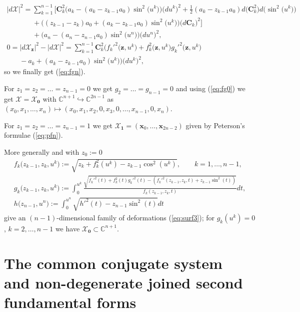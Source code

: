 \documentclass[11pt]{article}
\begin{document}
\begin{gather*}
|d\mathcal{X}|^2=\sum_{k=1}^{n-1}\big[\mathbf{C}_k^2\big(a_k-
(a_k-z_{k-1}a_0)\sin^2\big(u^k\big)\big)\big(du^k\big)^2
+\tfrac{1}{2}(a_k-z_{k-1}a_0)d\big(\mathbf{C}_k^2\big)d\big(\sin^2\big(u^k\big)\big)
\\
\phantom{|d\mathcal{X}|^2=}{}
+\big((z_{k-1}-z_k)a_0+
(a_k-z_{k-1}a_0)\sin^2\big(u^k\big)\big)\big(d\mathbf{C}_k\big)^2\big]\\
\phantom{|d\mathcal{X}|^2=}{}
+\big(a_n-(a_n-z_{n-1}a_0)\sin^2\big(u^n\big)\big)\big(du^n\big)^2,
\\
0=|d\mathcal{X}_{\mathbf{z}}|^2-|d\mathcal{X}|^2=
\sum_{k=1}^{n-1}\mathbf{C}_k^2\big(f_k'^2\big(\mathbf{z},u^k\big)
+f_k^2\big(\mathbf{z},u^k\big)g_k'^2\big(\mathbf{z},u^k\big)\\
\phantom{0=}{}-a_k+
(a_k-z_{k-1}a_0)\sin^2\big(u^k\big)\big)\big(du^k\big)^2,
\end{gather*}
so we f\/inally get (\ref{eq:fgn}).

For $z_1=z_2=\dots =z_{n-1}=0$ we get $g_2=\dots =g_{n-1}=0$ and using
(\ref{eq:fg0}) we get $\mathcal{X}=\mathcal{X}_{\mathbf{0}}$ with
$\mathbb{C}^{n+1}\hookrightarrow\mathbb{C}^{2n-1}$ as
$(x_0,x_1,\dots ,x_n)\mapsto(x_0,x_1,x_2,0,x_3,0,\dots ,x_{n-1},0,x_n)$.

For $z_1=z_2=\dots =z_{n-1}=1$ we get
$\mathcal{X}_{\mathbf{1}}=(\mathbf{x}_0,\dots ,\mathbf{x}_{2n-2})$
given by Peterson's formulae (\ref{eq:pfn}).

More generally and with $z_0:=0$
\begin{gather}
f_k\big(z_{k-1},z_k,u^k\big):=\sqrt{z_k+f_k^2(u^k)-z_{k-1}\cos^2(u^k)},\qquad k=1,\dots ,n-1,\nonumber\\
g_k\big(z_{k-1},z_k,u^k\big):=\int_0^{u^k}\frac{\sqrt{f_k'^2(t)+f_k^2(t)g_k'^2(t)-
(f_k'^2(z_{k-1},z_k,t)+z_{k-1}\sin^2(t))}}
{f_k(z_{k-1},z_k,t)}dt,\nonumber\\
h\big(z_{n-1},u^n\big):=\int_0^{u^n}\sqrt{h'^2(t)-z_{n-1}\sin^2(t)}dt \label{eq:fgr}
\end{gather}
give an $(n-1)$-dimensional family of deformations
(\ref{eq:surf3}); for $g_k(u^k)=0$, $k=2,\dots ,n-1$ we have
$\mathcal{X}_{\mathbf{0}}\subset\mathbb{C}^{n+1}$.

\section{The common conjugate system\\ and non-degenerate joined second fundamental forms}\label{sec:pet2}
\end{document}
